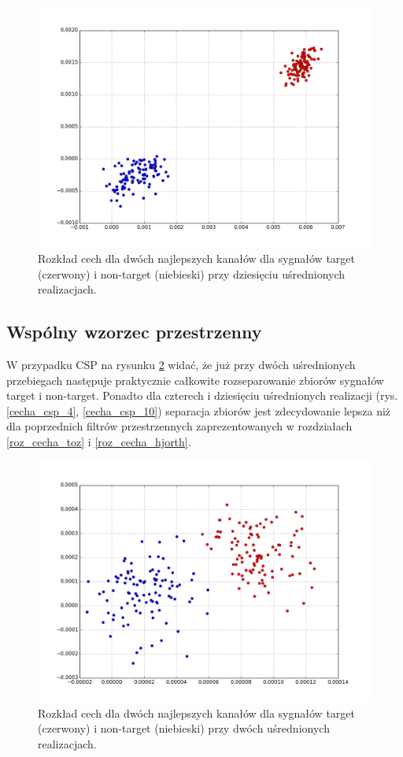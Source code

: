 \documentclass[licencjacka,openright]{pracamgr}
\begin{document}
\begin{figure}[H]
\centering
\includegraphics[scale=0.55, trim=10mm 15mm 10mm 18mm, clip=True]{pics/cecha_hjorth_10.png}
\caption{Rozkład cech dla dwóch najlepszych kanałów dla sygnałów target (czerwony) i non-target (niebieski) przy dziesięciu uśrednionych realizacjach.}
\label{cecha_hjorth_10}
\end{figure}


\subsection{Wspólny wzorzec przestrzenny}
\label{roz_cecha_csp}
W przypadku CSP na rysunku \ref{cecha_csp_2} widać, że już przy dwóch uśrednionych przebiegach następuje praktycznie całkowite rozseparowanie zbiorów sygnałów target i non-target. Ponadto dla czterech i dziesięciu uśrednionych realizacji (rys. \ref{cecha_csp_4}, \ref{cecha_csp_10}) separacja zbiorów jest zdecydowanie lepsza niż dla poprzednich filtrów przestrzennych zaprezentowanych w rozdziałach \ref{roz_cecha_toz} i \ref{roz_cecha_hjorth}.

\begin{figure}[H]
\centering
\includegraphics[scale=0.55, trim=10mm 15mm 10mm 18mm, clip=True]{pics/cecha_csp_2.png}
\caption{Rozkład cech dla dwóch najlepszych kanałów dla sygnałów target (czerwony) i non-target (niebieski) przy dwóch uśrednionych realizacjach.}
\label{cecha_csp_2}
\end{figure}
\end{document}
